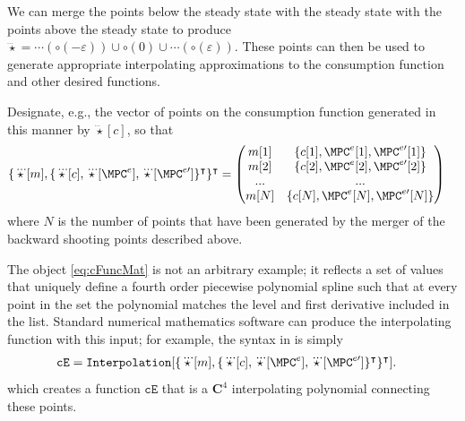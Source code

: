 \documentclass{handout}
\begin{document}
We can merge the points below the steady state with the steady state
with the points above the steady state to produce $\dddot{\star} =
\cdots(\pmb{\circ}(-\varepsilon)) \cup \pmb{\circ}(0) \cup
\cdots(\pmb{\circ}(\varepsilon)) $.  These points can then be used to
generate appropriate interpolating approximations to the consumption
function and other desired functions.

Designate, e.g., the vector of points on the consumption function
generated in this manner by $\dddot{\star}[c]$, so that 
\begin{equation}\begin{gathered}\begin{aligned}
   \{\dddot{\star}[m],\{\dddot{\star}[c],\dddot{\star}[\MPC^{e}],\dddot{\star}[\MPC^{e\prime}]\}^{\intercal}\}^{\intercal} & =  
\begin{pmatrix}
m[1] & \{c[1],\MPC^{e}[1],\MPC^{e\prime}[1]\} \\
m[2] & \{c[2],\MPC^{e}[2],\MPC^{e\prime}[2]\} \\
...  & ...              \\
m[N] & \{c[N],\MPC^{e}[N],\MPC^{e\prime}[N]\} \\
\end{pmatrix} \label{eq:cFuncMat}
\end{aligned}\end{gathered}\end{equation}
where $N$ is the number of points that have been generated by the merger of the backward
shooting points described above.  

The object \eqref{eq:cFuncMat} is not an arbitrary example; it reflects a set of values that 
uniquely define a fourth order piecewise polynomial spline such that at every point in the 
set the polynomial matches the level and first derivative included in the list.  Standard
numerical mathematics software can produce the interpolating function with this input; 
for example, the syntax in \Mma is simply
\begin{equation}\begin{gathered}\begin{aligned}
  \mathtt{cE} & =  \mathtt{Interpolation}[\{\dddot{\star}[m],\{\dddot{\star}[c],\dddot{\star}[\MPC^{e}],\dddot{\star}[\MPC^{e\prime}]\}^{\intercal}\}^{\intercal}].
\end{aligned}\end{gathered}\end{equation}
which creates a function $\texttt{cE}$ that is a $\mathbf{C}^4$ interpolating polynomial
connecting these points.
\end{document}
